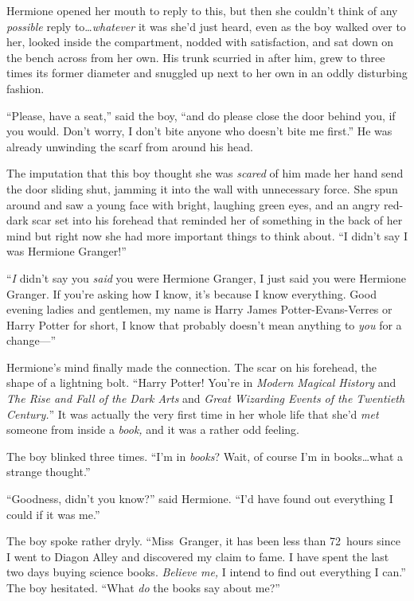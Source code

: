 Hermione opened her mouth to reply to this, but then she couldn’t think of any \emph{possible} reply to…\emph{whatever} it was she’d just heard, even as the boy walked over to her, looked inside the compartment, nodded with satisfaction, and sat down on the bench across from her own. His trunk scurried in after him, grew to three times its former diameter and snuggled up next to her own in an oddly disturbing fashion.

“Please, have a seat,” said the boy, “and do please close the door behind you, if you would. Don’t worry, I don’t bite anyone who doesn’t bite me first.” He was already unwinding the scarf from around his head.

The imputation that this boy thought she was \emph{scared} of him made her hand send the door sliding shut, jamming it into the wall with unnecessary force. She spun around and saw a young face with bright, laughing green eyes, and an angry red-dark scar set into his forehead that reminded her of something in the back of her mind but right now she had more important things to think about. “I didn’t say I was Hermione Granger!”

“\emph{I} didn’t say you \emph{said} you were Hermione Granger, I just said you were Hermione Granger. If you’re asking how I know, it’s because I know everything. Good evening ladies and gentlemen, my name is Harry James Potter-Evans-Verres or Harry Potter for short, I know that probably doesn’t mean anything to \emph{you} for a change—”

Hermione’s mind finally made the connection. The scar on his forehead, the shape of a lightning bolt. “Harry Potter! You’re in \emph{Modern Magical History} and \emph{The Rise and Fall of the Dark Arts} and \emph{Great Wizarding Events of the Twentieth Century.}” It was actually the very first time in her whole life that she’d \emph{met} someone from inside a \emph{book,} and it was a rather odd feeling.

The boy blinked three times. “I’m in \emph{books}? Wait, of course I’m in books…what a strange thought.”

“Goodness, didn’t you know?” said Hermione. “I’d have found out everything I could if it was me.”

The boy spoke rather dryly. “Miss~Granger, it has been less than 72~hours since I went to Diagon Alley and discovered my claim to fame. I have spent the last two days buying science books. \emph{Believe me,} I intend to find out everything I can.” The boy hesitated. “What \emph{do} the books say about me?”

